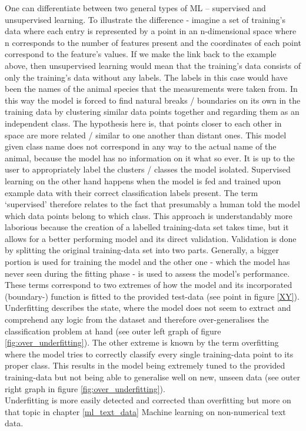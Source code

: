 One can differentiate between two general types of ML – supervised and unsupervised learning. To illustrate the difference - imagine a set of training's data where each entry is represented by a point in an n-dimensional space where n corresponds to the number of features present and the coordinates of each point correspond to the feature’s values. If we make the link back to the example above, then unsupervised learning would mean that the training's data consists of only the training's data without any labels. The labels in this case would have been the names of the animal species that the measurements were taken from. In this way the model is forced to find natural breaks / boundaries on its own in the training data by clustering similar data points together and regarding them as an independent class. The hypothesis here is, that points closer to each other in space are more related / similar to one another than distant ones. This model given class name does not correspond in any way to the actual name of the animal, because the model has no information on it what so ever. It is up to the user to appropriately label the clusters / classes the model isolated.
Supervised learning on the other hand happens when the model is fed and trained upon example data with their correct classification labels present. The term ‘supervised’ therefore relates to the fact that presumably a human told the model which data points belong to which class. This approach is understandably more laborious because the creation of a labelled training-data set takes time, but it allows for a better performing model and its direct validation. Validation is done by splitting the original training-data set into two parts. Generally, a bigger portion is used for training the model and the other one - which the model has never seen during the fitting phase - is used to assess the model’s performance.\\
\newline
These terms correspond to two extremes of how the model and its incorporated (boundary-) function is fitted to the provided test-data (see point in figure \ref{XY}). Underfitting describes the state, where the model does not seem to extract and comprehend any logic from the dataset and therefore over-generalises the classification problem at hand (see outer left graph of figure \ref{fig:over_underfitting}). The other extreme is known by the term overfitting where the model tries to correctly classify every single training-data point to its proper class. This results in the model being extremely tuned to the provided training-data but not being able to generalise well on new, unseen data (see outer right graph in figure \ref{fig:over_underfitting}).\\
Underfitting is more easily detected and corrected than overfitting but more on that topic in chapter \ref{ml_text_data} Machine learning on non-numerical text data.


